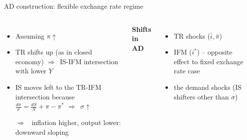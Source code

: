 \documentclass{beamer}
\newcommand{\tb}[1]{{\color{blue}{\textbf{#1}}}}
\newcommand{\tr}[1]{{\color{red}{\textbf{#1}}}}
\newcommand{\rarr}{$\Rightarrow$\ }
\begin{document}
\begin{frame}{AD construction: flexible exchange rate regime}
\begin{columns}
\begin{itemize}
\item Assuming $\pi\uparrow$
\item TR shifts up (as in closed economy) \rarr IS-IFM intersection with lower $Y$
\item IS moves left to the TR-IFM intersection because $\frac{d \sigma}{\sigma} = \frac{d S}{S} + \pi  - \pi^*$ \rarr $\sigma\uparrow$
\item[\rarr] inflation higher, output lower: downward sloping 
\tb{AD}
\end{itemize}
\textbf{Shifts in AD}
\begin{itemize}
  \item TR shocks ($\bar i, \bar \pi$)
  \item IFM ($i^*$) -- opposite effect to fixed exchange rate case
  \item \tr{NOT} the demand shocks (IS shifters other than $\sigma$) 
\end{itemize}

%
	
\end{columns} 	 
\end{frame}
\end{document}

